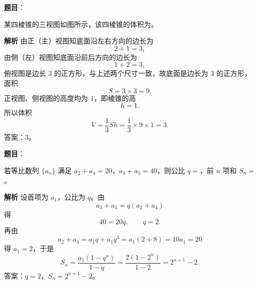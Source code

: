 \begin{answer}

\textbf{题目}：

某四棱锥的三视图如图所示，该四棱锥的体积为\gkblank{}。
\nopagebreak[4]
\begin{center}\end{center}
\nopagebreak[4]
\textbf{解析}
由正（主）视图知底面沿左右方向的边长为
\nopagebreak[4]
\[2+1=3,\]
由侧（左）视图知底面沿前后方向的边长为
\nopagebreak[4]
\[1+2=3,\]
俯视图是边长 $3$ 的正方形，与上述两个尺寸一致，故底面是边长为 $3$ 的正方形，面积
\nopagebreak[4]
\[S=3\times3=9.\]
正视图、侧视图的高度均为 $1$，即棱锥的高
\nopagebreak[4]
\[h=1.\]
所以体积
\nopagebreak[4]
\[V=\frac13Sh=\frac13\times9\times1=3.\]
答案：$3$。


\end{answer}
\begin{answer}

\textbf{题目}：

若等比数列 $\{a_n\}$ 满足 $a_2+a_4=20$，$a_3+a_5=40$，则公比 $q=$\gkblank{}，前 $n$ 项和 $S_n=$\gkblank{}。

\textbf{解析}
设首项为 $a_1$，公比为 $q$。由
\nopagebreak[4]
\[a_3+a_5=q(a_2+a_4)\]
得
\nopagebreak[4]
\[40=20q,\qquad q=2.\]
再由
\nopagebreak[4]
\[a_2+a_4=a_1q+a_1q^3=a_1(2+8)=10a_1=20\]
得 $a_1=2$，于是
\nopagebreak[4]
\[S_n=\frac{a_1(1-q^n)}{1-q}=\frac{2(1-2^n)}{1-2}=2^{n+1}-2.\]
答案：$q=2$，$S_n=2^{n+1}-2$。


\end{answer}
